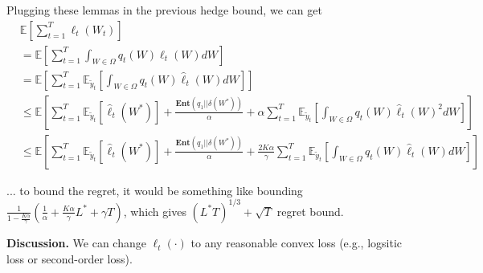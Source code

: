 \documentclass{article}
\newcommand{\field}[1]{\mathbb{#1}}
\newcommand{\E}{\field{E}}
\begin{document}
Plugging these lemmas in the previous hedge bound, we can get \begin{align*}
&\E\left[\sum_{t=1}^T  \ell_{t}(W_{t})  \right]\\
&=\E\left[\sum_{t=1}^T  \int_{W\in\Omega} q_t(W)\ell_t(W)dW  \right] \\
&=\E\left[\sum_{t=1}^T \E_{\tilde{y}_t} \left[ \int_{W\in\Omega} q_t(W)\hat{\ell}_t(W)dW \right] \right]\\
&\leq \E\left[\sum_{t=1}^T \E_{\tilde{y}_t} \left[ \hat{\ell}_t(W^*) \right]+ \frac{\textbf{Ent}(q_1||\delta(W^*))}{\alpha} + \alpha \sum_{t=1}^T \E_{\tilde{y}_t}\left[ \int_{W\in\Omega} q_t(W)\hat{\ell}_t(W)^2dW \right] \right] \\ 
&\leq \E\left[\sum_{t=1}^T \E_{\tilde{y}_t}\left[ \hat{\ell}_t(W^*) \right] + \frac{\textbf{Ent}(q_1||\delta(W^*))}{\alpha} + \frac{2K\alpha}{\gamma} \sum_{t=1}^T \E_{\tilde{y}_t}\left[ \int_{W\in\Omega} q_t(W)\hat{\ell}_t(W)dW \right]\right]
\end{align*}

... to bound the regret, it would be something like bounding $\frac{1}{1-\frac{K\alpha}{\gamma}}\left(\frac{1}{\alpha}+\frac{K\alpha}{\gamma}L^* + \gamma T\right)$, which gives $(L^*T)^{1/3} + \sqrt{T}$ regret bound. 


\textbf{Discussion.} We can change $\ell_t(\cdot)$ to any reasonable convex loss (e.g., logsitic loss or second-order loss). 





\newpage
% 
%
\end{document}
